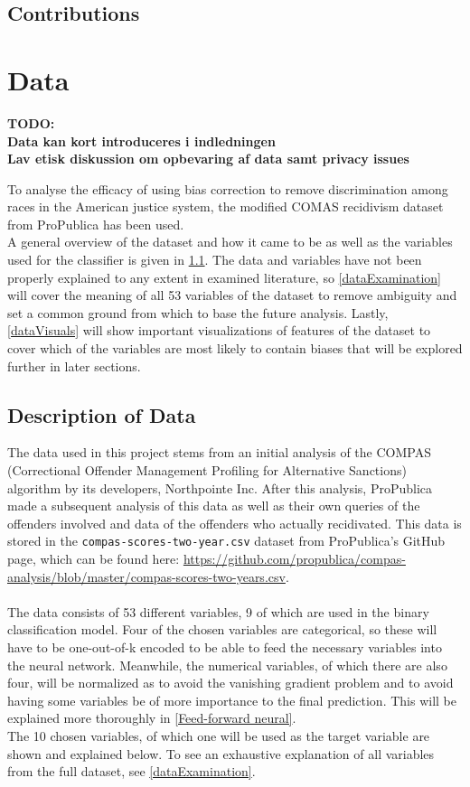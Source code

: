 \documentclass[11pt, fleqn, titlepage]{article}
\begin{document}
	
	\subsection{Contributions}

	
	
	\section{Data}
	\textbf{TODO: \\ Data kan kort introduceres i indledningen \\ Lav etisk diskussion om opbevaring af data samt privacy issues}
	
	\noindent To analyse the efficacy of using bias correction to remove discrimination among races in the American justice system, the modified COMAS recidivism dataset from ProPublica has been used. \\
	A general overview of the dataset and how it came to be as well as the variables used for the classifier is given in \ref{dataDescription}. The data and variables have not been properly explained to any extent in examined literature, so \ref{dataExamination} will cover the meaning of all 53 variables of the dataset to remove ambiguity and set a common ground from which to base the future analysis. Lastly, \ref{dataVisuals} will show important visualizations of features of the dataset to cover which of the variables are most likely to contain biases that will be explored further in later sections.
	
	\subsection{Description of Data} \label{dataDescription}
	The data used in this project stems from an initial analysis of the COMPAS (Correctional Offender Management Profiling for Alternative Sanctions) algorithm by its developers, Northpointe Inc. After this analysis, ProPublica made a subsequent analysis of this data as well as their own queries of the offenders involved and data of the offenders who actually recidivated. This data is stored in the \texttt{compas-scores-two-year.csv} dataset from ProPublica's GitHub page, which can be found here: \url{https://github.com/propublica/compas-analysis/blob/master/compas-scores-two-years.csv}. \\\\
	\noindent The data consists of 53 different variables, 9 of which are used in the binary classification model. Four of the chosen variables are categorical, so these will have to be one-out-of-k encoded to be able to feed the necessary variables into the neural network. Meanwhile, the numerical variables, of which there are also four, will be normalized as to avoid the vanishing gradient problem and to avoid having some variables be of more importance to the final prediction. This will be explained more thoroughly in \ref{Feed-forward neural}. \\
	The 10 chosen variables, of which one will be used as the target variable are shown and explained below. To see an exhaustive explanation of all variables from the full dataset, see \ref{dataExamination}.
	
\end{document}
